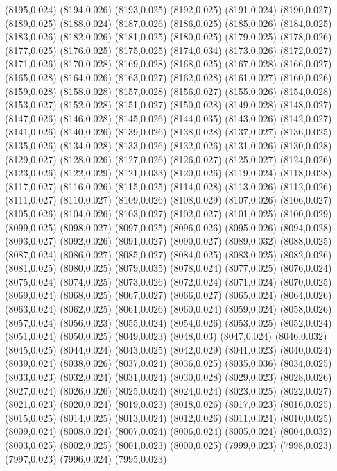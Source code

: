 (8195,0.024)
(8194,0.026)
(8193,0.025)
(8192,0.025)
(8191,0.024)
(8190,0.027)
(8189,0.025)
(8188,0.024)
(8187,0.026)
(8186,0.025)
(8185,0.026)
(8184,0.025)
(8183,0.026)
(8182,0.026)
(8181,0.025)
(8180,0.025)
(8179,0.025)
(8178,0.026)
(8177,0.025)
(8176,0.025)
(8175,0.025)
(8174,0.034)
(8173,0.026)
(8172,0.027)
(8171,0.026)
(8170,0.028)
(8169,0.028)
(8168,0.025)
(8167,0.028)
(8166,0.027)
(8165,0.028)
(8164,0.026)
(8163,0.027)
(8162,0.028)
(8161,0.027)
(8160,0.026)
(8159,0.028)
(8158,0.028)
(8157,0.028)
(8156,0.027)
(8155,0.026)
(8154,0.028)
(8153,0.027)
(8152,0.028)
(8151,0.027)
(8150,0.028)
(8149,0.028)
(8148,0.027)
(8147,0.026)
(8146,0.028)
(8145,0.026)
(8144,0.035)
(8143,0.026)
(8142,0.027)
(8141,0.026)
(8140,0.026)
(8139,0.026)
(8138,0.028)
(8137,0.027)
(8136,0.025)
(8135,0.026)
(8134,0.028)
(8133,0.026)
(8132,0.026)
(8131,0.026)
(8130,0.028)
(8129,0.027)
(8128,0.026)
(8127,0.026)
(8126,0.027)
(8125,0.027)
(8124,0.026)
(8123,0.026)
(8122,0.029)
(8121,0.033)
(8120,0.026)
(8119,0.024)
(8118,0.028)
(8117,0.027)
(8116,0.026)
(8115,0.025)
(8114,0.028)
(8113,0.026)
(8112,0.026)
(8111,0.027)
(8110,0.027)
(8109,0.026)
(8108,0.029)
(8107,0.026)
(8106,0.027)
(8105,0.026)
(8104,0.026)
(8103,0.027)
(8102,0.027)
(8101,0.025)
(8100,0.029)
(8099,0.025)
(8098,0.027)
(8097,0.025)
(8096,0.026)
(8095,0.026)
(8094,0.028)
(8093,0.027)
(8092,0.026)
(8091,0.027)
(8090,0.027)
(8089,0.032)
(8088,0.025)
(8087,0.024)
(8086,0.027)
(8085,0.027)
(8084,0.025)
(8083,0.025)
(8082,0.026)
(8081,0.025)
(8080,0.025)
(8079,0.035)
(8078,0.024)
(8077,0.025)
(8076,0.024)
(8075,0.024)
(8074,0.025)
(8073,0.026)
(8072,0.024)
(8071,0.024)
(8070,0.025)
(8069,0.024)
(8068,0.025)
(8067,0.027)
(8066,0.027)
(8065,0.024)
(8064,0.026)
(8063,0.024)
(8062,0.025)
(8061,0.026)
(8060,0.024)
(8059,0.024)
(8058,0.026)
(8057,0.024)
(8056,0.023)
(8055,0.024)
(8054,0.026)
(8053,0.025)
(8052,0.024)
(8051,0.024)
(8050,0.025)
(8049,0.023)
(8048,0.03)
(8047,0.024)
(8046,0.032)
(8045,0.025)
(8044,0.024)
(8043,0.025)
(8042,0.029)
(8041,0.023)
(8040,0.024)
(8039,0.024)
(8038,0.026)
(8037,0.024)
(8036,0.025)
(8035,0.036)
(8034,0.025)
(8033,0.023)
(8032,0.024)
(8031,0.024)
(8030,0.028)
(8029,0.023)
(8028,0.026)
(8027,0.024)
(8026,0.026)
(8025,0.024)
(8024,0.024)
(8023,0.025)
(8022,0.027)
(8021,0.023)
(8020,0.024)
(8019,0.023)
(8018,0.026)
(8017,0.023)
(8016,0.025)
(8015,0.025)
(8014,0.025)
(8013,0.024)
(8012,0.026)
(8011,0.024)
(8010,0.025)
(8009,0.024)
(8008,0.024)
(8007,0.024)
(8006,0.024)
(8005,0.024)
(8004,0.032)
(8003,0.025)
(8002,0.025)
(8001,0.023)
(8000,0.025)
(7999,0.023)
(7998,0.023)
(7997,0.023)
(7996,0.024)
(7995,0.023)
